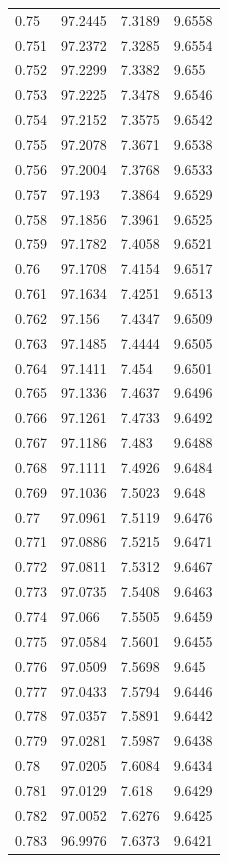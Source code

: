 \begin{tabular}{llll}
0.75 & 97.2445 & 7.3189 & 9.6558 \\
0.751 & 97.2372 & 7.3285 & 9.6554 \\
0.752 & 97.2299 & 7.3382 & 9.655 \\
0.753 & 97.2225 & 7.3478 & 9.6546 \\
0.754 & 97.2152 & 7.3575 & 9.6542 \\
0.755 & 97.2078 & 7.3671 & 9.6538 \\
0.756 & 97.2004 & 7.3768 & 9.6533 \\
0.757 & 97.193 & 7.3864 & 9.6529 \\
0.758 & 97.1856 & 7.3961 & 9.6525 \\
0.759 & 97.1782 & 7.4058 & 9.6521 \\
0.76 & 97.1708 & 7.4154 & 9.6517 \\
0.761 & 97.1634 & 7.4251 & 9.6513 \\
0.762 & 97.156 & 7.4347 & 9.6509 \\
0.763 & 97.1485 & 7.4444 & 9.6505 \\
0.764 & 97.1411 & 7.454 & 9.6501 \\
0.765 & 97.1336 & 7.4637 & 9.6496 \\
0.766 & 97.1261 & 7.4733 & 9.6492 \\
0.767 & 97.1186 & 7.483 & 9.6488 \\
0.768 & 97.1111 & 7.4926 & 9.6484 \\
0.769 & 97.1036 & 7.5023 & 9.648 \\
0.77 & 97.0961 & 7.5119 & 9.6476 \\
0.771 & 97.0886 & 7.5215 & 9.6471 \\
0.772 & 97.0811 & 7.5312 & 9.6467 \\
0.773 & 97.0735 & 7.5408 & 9.6463 \\
0.774 & 97.066 & 7.5505 & 9.6459 \\
0.775 & 97.0584 & 7.5601 & 9.6455 \\
0.776 & 97.0509 & 7.5698 & 9.645 \\
0.777 & 97.0433 & 7.5794 & 9.6446 \\
0.778 & 97.0357 & 7.5891 & 9.6442 \\
0.779 & 97.0281 & 7.5987 & 9.6438 \\
0.78 & 97.0205 & 7.6084 & 9.6434 \\
0.781 & 97.0129 & 7.618 & 9.6429 \\
0.782 & 97.0052 & 7.6276 & 9.6425 \\
0.783 & 96.9976 & 7.6373 & 9.6421 \\

\end{tabular}
